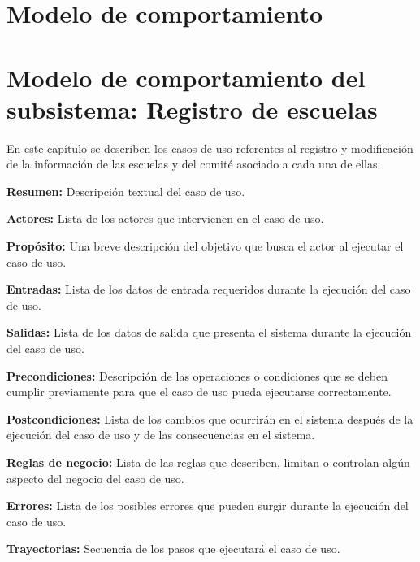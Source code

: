 \documentclass[10pt]{book}
\begin{document}
\chapter{Modelo de comportamiento}\label{chp:modeloComportamiento}

\chapter{Modelo de comportamiento del subsistema: Registro de escuelas \label{chp:modeloComportamientoRegistro}}
En este capítulo se describen los casos de uso referentes al registro y modificación de la información de las escuelas y del comité asociado a cada una de ellas. \bigskip

     \begin{objetivos}
	\item {\bf Resumen:} Descripción textual del caso de uso.
	\item {\bf Actores:} Lista de los actores que intervienen en el caso de uso.
	\item {\bf Propósito:} Una breve descripción del objetivo que busca el actor al ejecutar el caso de uso.
	\item {\bf Entradas:} Lista de los datos de entrada requeridos durante la ejecución del caso de uso.
	\item {\bf Salidas:} Lista de los datos de salida que presenta el sistema durante la ejecución del caso de uso.
	\item {\bf Precondiciones:} Descripción de las operaciones o condiciones que se deben cumplir previamente para que el caso de uso pueda ejecutarse correctamente.
	\item {\bf Postcondiciones:} Lista de los cambios que ocurrirán en el sistema después de la ejecución del caso de uso y de las consecuencias en el sistema.
	\item {\bf Reglas de negocio:} Lista de las reglas que describen, limitan o controlan algún aspecto del negocio del caso de uso.
	\item {\bf Errores:} Lista de los posibles errores que pueden surgir durante la ejecución del caso de uso.
	\item {\bf Trayectorias:} Secuencia de los pasos que ejecutará el caso de uso.
    \end{objetivos}
\end{document}
